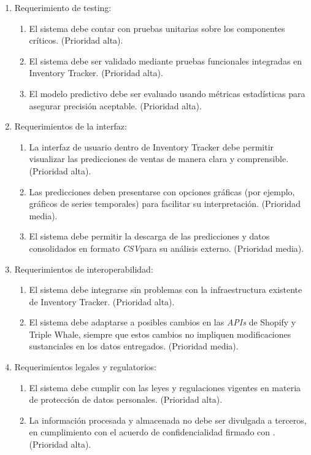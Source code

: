 \documentclass[
11pt, %
]{charter}
\begin{document}
\begin{enumerate}
\begin{enumerate}
		\end{enumerate}
	\item Requerimiento de testing:
		\begin{enumerate}
			\item El sistema debe contar con pruebas unitarias sobre los componentes críticos. (Prioridad alta).
			\item El sistema debe ser validado mediante pruebas funcionales integradas en Inventory Tracker. (Prioridad alta).
			\item El modelo predictivo debe ser evaluado usando métricas estadísticas para asegurar precisión aceptable. (Prioridad alta).
		\end{enumerate}
	\item Requerimientos de la interfaz:
		\begin{enumerate}  
			\item La interfaz de usuario dentro de Inventory Tracker debe permitir visualizar las predicciones de ventas de manera clara y comprensible. (Prioridad alta).
			\item Las predicciones deben presentarse con opciones gráficas (por ejemplo, gráficos de series temporales) para facilitar su interpretación. (Prioridad media).
			\item El sistema debe permitir la descarga de las predicciones y datos consolidados en formato \textit{CSV}para su análisis externo. (Prioridad media).
		\end{enumerate}

	\item Requerimientos de interoperabilidad:  
		\begin{enumerate}  
		\item El sistema debe integrarse sin problemas con la infraestructura existente de Inventory Tracker. (Prioridad alta).
		\item El sistema debe adaptarse a posibles cambios en las \textit{APIs} de Shopify y Triple Whale, siempre que estos cambios no impliquen modificaciones sustanciales en los datos entregados. (Prioridad media). 
		\end{enumerate}  
	
	\item Requerimientos legales y regulatorios:
		\begin{enumerate}  
		\item El sistema debe cumplir con las leyes y regulaciones vigentes en materia de protección de datos personales. (Prioridad alta).
		\item La información procesada y almacenada no debe ser divulgada a terceros, en cumplimiento con el acuerdo de confidencialidad firmado con \empclientename. (Prioridad alta).
		\end{enumerate} 

\end{enumerate}
\end{document}
